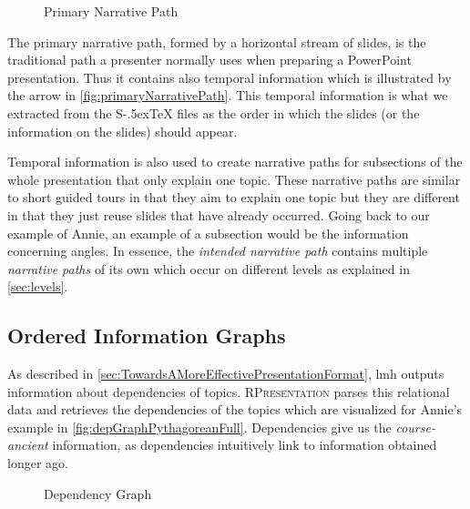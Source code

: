 \documentclass{llncs}
\def\stex{\texorpdfstring{\raisebox{-.5ex}S\kern-.5ex\TeX}{sTeX}\xspace}
\newcommand{\sys}{\textsc{RPresentation}\xspace}
\begin{document}
\begin{figure}[ht]\centering
  \vspace{-.5em}
  \caption{Primary Narrative Path}\label{fig:primaryNarrativePath}
  \vspace{-1em}
\end{figure}

The primary narrative path, formed by a horizontal stream of slides, is the traditional
path a presenter normally uses when preparing a PowerPoint presentation. Thus it contains
also temporal information which is illustrated by the arrow in
\autoref{fig:primaryNarrativePath}. This temporal information is what we extracted from
the \stex files as the order in which the slides (or the information on the slides) should
appear.

Temporal information is also used to create narrative paths for subsections of the whole presentation that only explain one topic. These narrative paths are similar to short guided tours in that they aim to explain one topic but they are different in that they just reuse slides that have already occurred. Going back to our example of Annie, an example of a subsection would be the information concerning angles. In essence, the \textit{intended narrative path} contains multiple \textit{narrative paths} of its own which occur on different levels as explained in \autoref{sec:levels}.

\subsection{Ordered Information Graphs}
\label{sec:orderedInfoGraphs}

As described in \autoref{sec:TowardsAMoreEffectivePresentationFormat}, lmh outputs information about dependencies of topics. \sys parses this relational data and retrieves the dependencies of the topics which are visualized for Annie's example in \autoref{fig:depGraphPythagoreanFull}. Dependencies give us the \textit{course-ancient} information, as dependencies intuitively link to information obtained longer ago.

\begin{figure}[ht]\vspace{-1em}
  \vspace{-.5em}
  \caption{Dependency Graph}\label{fig:depGraphPythagoreanFull}
\end{figure}
\end{document}
